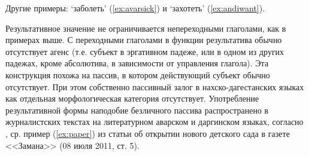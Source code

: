 
Другие примеры: `заболеть' (\ref{ex:avarsick}) и `захотеть' (\ref{ex:andiwant}).



Результативное значение не ограничивается непереходными глаголами, как в примерах выше. С переходными глаголами в функции результатива обычно отсутствует агенс (т.е. субъект в эргативном падеже, или в одном из других падежах, кроме абсолютива, в зависимости от управления глагола). Эта конструкция похожа на пассив, в котором действующий субъект обычно отсутствует. При этом собственно пассивный залог в нахско-дагестанских языках как отдельная морфологическая категория отсутствует. Употребление результативной формы наподобие безличного пассива распространено в журналистских текстах на литературном аварском и даргинском языках, согласно \citep[495]{forker2018evid}, ср. пример (\ref{ex:paper}) из статьи об открытии нового детского сада в газете <<Замана>> (08 июля 2011, ст. 5).


